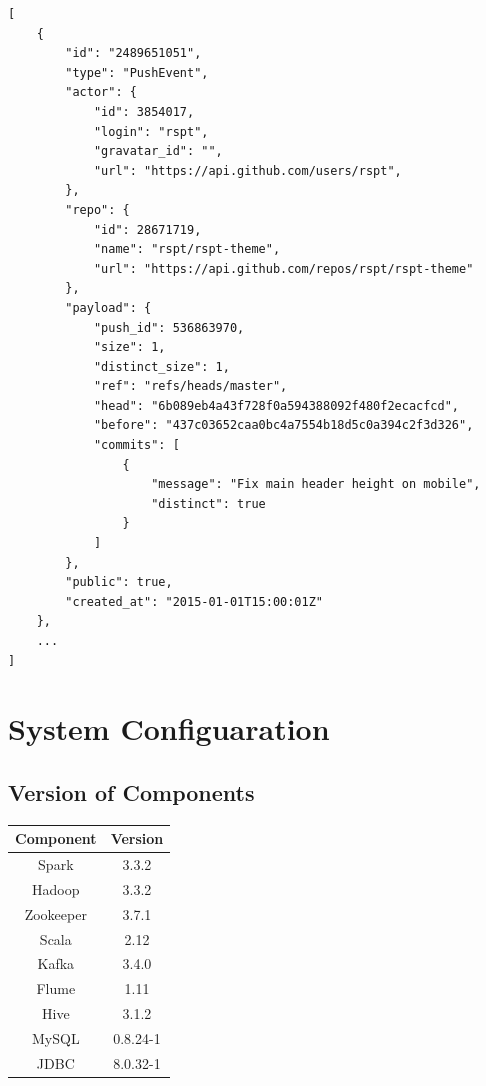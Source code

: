 \begin{verbatim}
[
    {
        "id": "2489651051",
        "type": "PushEvent",
        "actor": {
            "id": 3854017,
            "login": "rspt",
            "gravatar_id": "",
            "url": "https://api.github.com/users/rspt",
        },
        "repo": {
            "id": 28671719,
            "name": "rspt/rspt-theme",
            "url": "https://api.github.com/repos/rspt/rspt-theme"
        },
        "payload": {
            "push_id": 536863970,
            "size": 1,
            "distinct_size": 1,
            "ref": "refs/heads/master",
            "head": "6b089eb4a43f728f0a594388092f480f2ecacfcd",
            "before": "437c03652caa0bc4a7554b18d5c0a394c2f3d326",
            "commits": [
                {
                    "message": "Fix main header height on mobile",
                    "distinct": true
                }
            ]
        },
        "public": true,
        "created_at": "2015-01-01T15:00:01Z"
    },
    ...
]
\end{verbatim}



\section{System Configuaration}
\subsection{Version of Components}
\label{a-version}


\begin{table}[H]
    \centering
    \begin{tabular}{cc}
        \hline
    Component & Version  \\ \hline
    Spark     & 3.3.2    \\
    Hadoop    & 3.3.2    \\
    Zookeeper & 3.7.1    \\
    Scala     & 2.12     \\
    Kafka     & 3.4.0    \\
    Flume     & 1.11     \\
    Hive      & 3.1.2    \\
    MySQL     & 0.8.24-1 \\
    JDBC      & 8.0.32-1 \\
    \hline
    \end{tabular}
\end{table}



